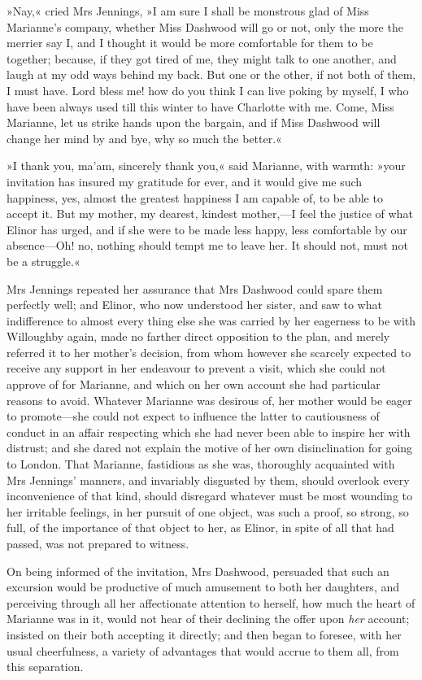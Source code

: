 »Nay,« cried Mrs Jennings, »I am sure I shall be monstrous glad of Miss Marianne’s company, whether Miss Dashwood will go or not, only the more the merrier say I, and I thought it would be more comfortable for them to be together; because, if they got tired of me, they might talk to one another, and laugh at my odd ways behind my back. But one or the other, if not both of them, I must have. Lord bless me! how do you think I can live poking by myself, I who have been always used till this winter to have Charlotte with me. Come, Miss Marianne, let us strike hands upon the bargain, and if Miss Dashwood will change her mind by and bye, why so much the better.«

»I thank you, ma’am, sincerely thank you,« said Marianne, with warmth: »your invitation has insured my gratitude for ever, and it would give me such happiness, yes, almost the greatest happiness I am capable of, to be able to accept it. But my mother, my dearest, kindest mother,—I feel the justice of what Elinor has urged, and if she were to be made less happy, less comfortable by our absence—Oh! no, nothing should tempt me to leave her. It should not, must not be a struggle.«

Mrs Jennings repeated her assurance that Mrs Dashwood could spare them perfectly well; and Elinor, who now understood her sister, and saw to what indifference to almost every thing else she was carried by her eagerness to be with Willoughby again, made no farther direct opposition to the plan, and merely referred it to her mother’s decision, from whom however she scarcely expected to receive any support in her endeavour to prevent a visit, which she could not approve of for Marianne, and which on her own account she had particular reasons to avoid. Whatever Marianne was desirous of, her mother would be eager to promote—she could not expect to influence the latter to cautiousness of conduct in an affair respecting which she had never been able to inspire her with distrust; and she dared not explain the motive of her own disinclination for going to London. That Marianne, fastidious as she was, thoroughly acquainted with Mrs Jennings’ manners, and invariably disgusted by them, should overlook every inconvenience of that kind, should disregard whatever must be most wounding to her irritable feelings, in her pursuit of one object, was such a proof, so strong, so full, of the importance of that object to her, as Elinor, in spite of all that had passed, was not prepared to witness.

On being informed of the invitation, Mrs Dashwood, persuaded that such an excursion would be productive of much amusement to both her daughters, and perceiving through all her affectionate attention to herself, how much the heart of Marianne was in it, would not hear of their declining the offer upon \textit{her} account; insisted on their both accepting it directly; and then began to foresee, with her usual cheerfulness, a variety of advantages that would accrue to them all, from this separation.

